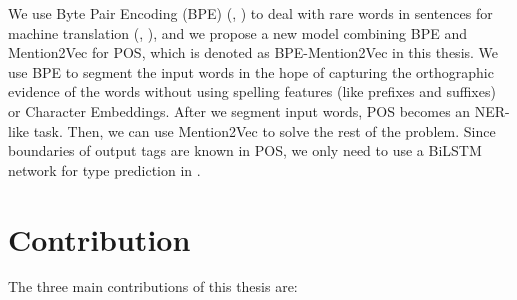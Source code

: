 We use Byte Pair Encoding (BPE) (\citeauthor{gage1994new}, \citeyear{gage1994new}) to deal with rare words in sentences for machine translation (\citeauthor{sennrich2015neural}, \citeyear{sennrich2015neural}), and we propose a new model combining BPE and Mention2Vec for POS, which is denoted as BPE-Mention2Vec in this thesis. We use BPE to segment the input words in the hope of capturing the orthographic evidence of the words without using spelling features (like prefixes and suffixes) or Character Embeddings. After we segment input words, POS becomes an NER-like task. Then, we can use Mention2Vec to solve the rest of the problem. Since boundaries of output tags are known in POS, we only need to use a BiLSTM network for type prediction in \mb.

\section{Contribution}
The three main contributions of this thesis are:

